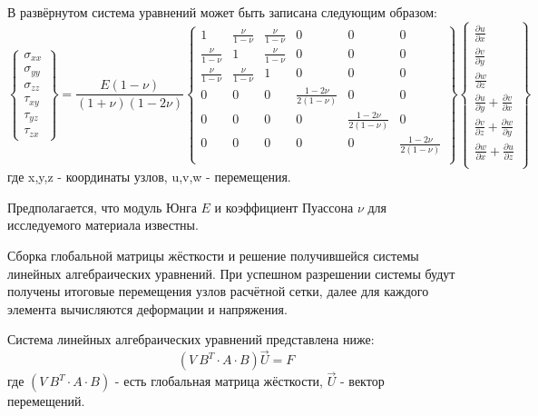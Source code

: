 \documentclass[a4paper,12pt]{article}
\begin{document}
	В развёрнутом система уравнений может быть записана следующим образом:
\begin{equation}
\begin{Bmatrix}
 \sigma_{xx} \\
 \sigma_{yy} \\
 \sigma_{zz} \\ 
 \tau_{xy}   \\
 \tau_{yz}   \\
 \tau_{zx}    
\end{Bmatrix}
= \frac{E(1-\nu)}{(1+\nu)(1-2\nu)}
\begin{Bmatrix}
 1 & \frac{\nu }{1-\nu} & \frac{\nu }{1-\nu} & 0 & 0 & 0 \\
 \frac{\nu }{1-\nu} & 1 & \frac{\nu }{1-\nu} & 0 & 0 & 0 \\
 \frac{\nu }{1-\nu} & \frac{\nu }{1-\nu} & 1 & 0 & 0 & 0 \\
 0 & 0 & 0 & \frac{1-2\nu}{2(1-\nu)} & 0 & 0 \\ 
 0 & 0 & 0 & 0 & \frac{1-2\nu}{2(1-\nu)} & 0 \\ 
 0 & 0 & 0 & 0 & 0 & \frac{1-2\nu}{2(1-\nu)} \\       
\end{Bmatrix}
\begin{Bmatrix}
\frac{\partial u}{\partial x} \\
\frac{\partial v}{\partial y} \\
\frac{\partial w}{\partial z} \\
\frac{\partial u}{\partial y}+\frac{\partial v}{\partial x} \\
\frac{\partial v}{\partial z}+\frac{\partial w}{\partial y} \\
\frac{\partial w}{\partial x}+\frac{\partial u}{\partial z} \\
\end{Bmatrix}
\end{equation}
где x,y,z - координаты узлов, u,v,w - перемещения.

Предполагается, что модуль Юнга $E$ и коэффициент Пуассона $\nu$ для исследуемого материала известны. 

Сборка глобальной матрицы жёсткости и решение получившейся системы линейных алгебраических уравнений. При успешном разрешении системы будут получены итоговые перемещения узлов расчётной сетки, далее для каждого элемента вычисляются деформации и напряжения.

Система линейных алгебраических уравнений представлена ниже:
\begin{equation}
(V\: B^T\cdot A\cdot B) \vec{U} = F
\end{equation}
где $(V\: B^T\cdot A\cdot B)$ - есть глобальная матрица жёсткости, $\vec{U}$ - вектор перемещений.
\end{document}
